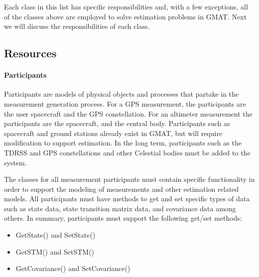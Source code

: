 Each class in this list has specific responsibilities and, with a few exceptions, all of the classes
above are employed to solve estimation problems in GMAT.  Next we will discuss the responsibilities
of each class.

\subsection{Resources}

\paragraph{Participants}  Participants are models of physical objects and processes that partake in
the measurement generation process.   For a GPS measurement, the participants are the user
spacecraft and the GPS constellation.  For an altimeter measurement the participants are the
spacecraft, and the central body.  Participants such as spacecraft and ground stations already exist
in GMAT, but will require modification to support estimation.  In the long term, participants such
as the TDRSS and GPS constellations and other Celestial bodies must be added to the system.

The classes for all measurement participants must contain specific functionality in order to support
the modeling of measurements and other estimation related models.    All participants must have
methods to get and set specific types of data such as state data, state transition matrix data, and
covariance data among others.  In summary, participants must support the following get/set methods:
\begin{itemize}
\item GetState() and SetState()
\item GetSTM() and SetSTM()
\item GetCovariance() and SetCovariance()
\end{itemize}

